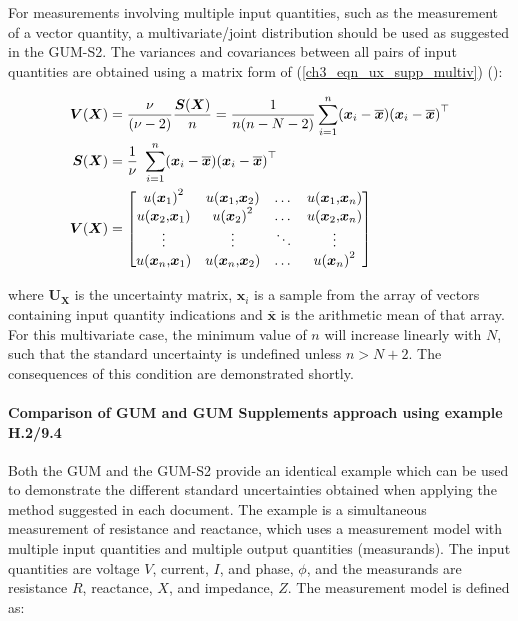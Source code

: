 \documentclass[../thesis/thesis.tex]{subfiles}
\begin{document}
\begin{refsection}
For measurements involving multiple input quantities, such as the measurement of a vector quantity, a multivariate/joint distribution should be used as suggested in the GUM-S2. The variances and covariances between all pairs of input quantities are obtained using a matrix form of (\ref{ch3_eqn_ux_supp_multiv}) (\cite[Section~5.3.2]{GUM_S2}):

\begin{align}
\boldsymbol V(\boldsymbol X) & = \frac\nu{(\nu-2)}\frac{\boldsymbol S(\boldsymbol X)}n=\frac1{n(n-N-2)}\sum_{i=1}^n({\boldsymbol x}_i-\overline{\boldsymbol x}){({\boldsymbol x}_i-\overline{\boldsymbol x})}^\top
\\
\boldsymbol S(\boldsymbol X) & = \frac1\nu\hspace{0.35em}\sum_{i=1}^n({\boldsymbol x}_i-\overline{\boldsymbol x}){({\boldsymbol x}_i-\overline{\boldsymbol x})}^\top
\\
\boldsymbol V(\boldsymbol X) & = \begin{bmatrix}u{({\boldsymbol x}_1)}^2&u({\boldsymbol x}_1\text{,}{\boldsymbol x}_2)&\dots&u({\boldsymbol x}_1\text{,}{\boldsymbol x}_n)\\u({\boldsymbol x}_2\text{,}{\boldsymbol x}_1)&u{({\boldsymbol x}_2)}^2&\dots&u({\boldsymbol x}_2\text{,}{\boldsymbol x}_n)\\\vdots&\vdots&\ddots&\vdots\\u({\boldsymbol x}_n\text{,}{\boldsymbol x}_1)&u({\boldsymbol x}_n\text{,}{\boldsymbol x}_2)&\dots&u{({\boldsymbol x}_n)}^2\end{bmatrix}
\end{align}

where $\bm{U_X}$ is the uncertainty matrix, $\bm{x}_i$ is a sample from the array of vectors containing input quantity indications and $\bar{\bm{x}}$ is the arithmetic mean of that array. For this multivariate case, the minimum value of $n$ will increase linearly with $N$, such that the standard uncertainty is undefined unless $n > N + 2$. The consequences of this condition are demonstrated shortly.

\paragraph{Comparison of GUM and GUM Supplements approach using example H.2/9.4}

Both the GUM and the GUM-S2 provide an identical example which can be used to demonstrate the different standard uncertainties obtained when applying the method suggested in each document. The example is a simultaneous measurement of resistance and reactance, which uses a measurement model with multiple input quantities and multiple output quantities (measurands). The input quantities are voltage $V$, current, $I$, and phase, $\phi$, and the measurands are resistance $R$, reactance, $X$, and impedance, $Z$. The measurement model is defined as:


\end{refsection}
\end{document}
